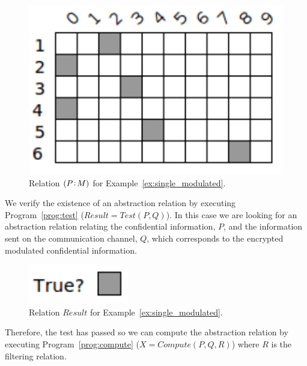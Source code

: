 \begin{example}
	\begin{figure}[ht]
		\centering
		\includegraphics[scale=0.65]{Figures/PDF/Relview/PNoiseP.pdf}
		\caption{Relation $(\RAcompose{P}{M})$ for Example~\ref{ex:single_modulated}.}
		\label{fig:single_modulated_ps}
	\end{figure}
	
	We verify the existence of an abstraction relation by executing Program~\ref{prog:test} ($Result = Test(P, Q)$). In this case we are looking for an abstraction relation relating the confidential information, $P$, and the information sent on the communication channel, $Q$, which corresponds to the encrypted modulated confidential information. \newline

	\begin{figure}[ht]
		\centering
		\includegraphics[scale=0.65]{Figures/PDF/Relview/True.pdf}
		\caption{Relation $Result$ for Example~\ref{ex:single_modulated}.}
		\label{fig:single_modulated_result}
	\end{figure}

	Therefore, the test has passed so we can compute the abstraction relation by executing Program~\ref{prog:compute} ($X = Compute(P,Q,R)$) where $R$ is the filtering relation. \newline


\end{example}
